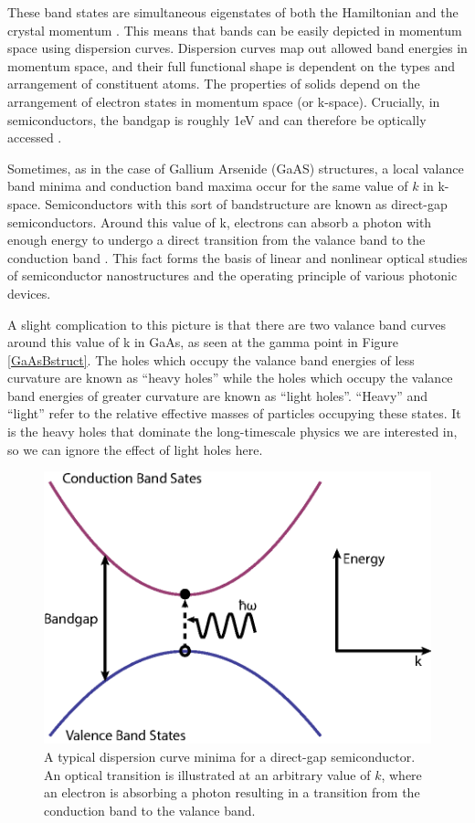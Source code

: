 \indent These band states are simultaneous eigenstates of both the Hamiltonian and the crystal momentum \cite{davies, fox}. This means that bands can be easily depicted in momentum space using dispersion curves. Dispersion curves map out allowed band energies in momentum space, and their full functional shape is dependent on the types and arrangement of constituent atoms.  The properties of solids depend on the arrangement of electron states in momentum space (or k-space). Crucially, in semiconductors, the bandgap is roughly 1eV and can therefore be optically accessed \cite{fox}. 

\indent Sometimes, as in the case of Gallium Arsenide (GaAS) structures, a local valance band minima and conduction band maxima occur for the same value of $k$ in k-space. Semiconductors with this sort of bandstructure are known as direct-gap semiconductors. Around this value of k, electrons can absorb a photon with enough energy to undergo a direct transition from the valance band to the conduction band \cite{iadonisi, galanthesis}. This fact forms the basis of linear and nonlinear optical studies of semiconductor nanostructures \cite{stevereview} and the operating principle of various photonic devices.

\indent A slight complication to this picture is that there are two valance band curves around this value of k in GaAs, as seen at the gamma point in Figure \ref{GaAsBstruct}. The holes which occupy the valance band energies of less curvature are known as ``heavy holes'' while the holes which occupy the valance band energies of greater curvature are known as ``light holes''. ``Heavy'' and ``light'' refer to the relative effective masses of particles occupying these states. It is the heavy holes that dominate the long-timescale physics we are interested in, so we can ignore the effect of light holes here. 

\begin{figure}[h]
\centering
\includegraphics[width = .4\textwidth]{dispcurve.eps}
\caption{ \doublespacing A typical dispersion curve minima for a direct-gap semiconductor. An optical transition is illustrated at an arbitrary value of $k$, where an electron is absorbing a photon resulting in a transition from the conduction band to the valance band.}
\label{ExampleBands}
\end{figure}

